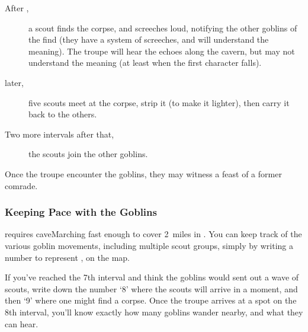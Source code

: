 \begin{multicols}{2}
\begin{description}
  \item[After ,]
  a scout finds the corpse, and screeches loud, notifying the other goblins of the find (they have a system of screeches, and will understand the meaning).
  The troupe will hear the echoes along the cavern, but may not understand the meaning (at least when the first character falls).
  \item[ later,]
  five scouts meet at the corpse, strip it (to make it lighter), then carry it back to the others.
  \item[Two more \glspl{interval} after that,]
  the scouts join the other goblins.
\end{description}

Once the troupe encounter the goblins, they may witness a feast of a former comrade.

\subsubsection{Keeping Pace with the Goblins}
requires \gls{caveMarching} fast enough to cover 2~miles in .
You can keep track of the various goblin movements, including multiple scout groups, simply by writing a number to represent , on the map.

If you've reached the 7th \gls{interval} and think the goblins would sent out a wave of scouts, write down the number `8' where the scouts will arrive in a moment, and then `9' where one might find a corpse.
Once the troupe arrives at a spot on the 8th \gls{interval}, you'll know exactly how many goblins wander nearby, and what they can hear.

\end{multicols}
